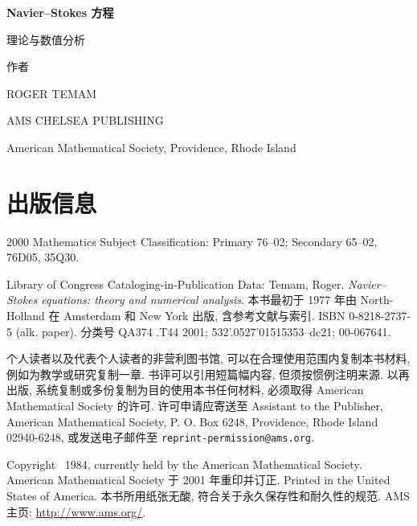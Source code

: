 \hypersetup{pageanchor=false}



\clearpage
\thispagestyle{empty}
\null
\clearpage

\begin{titlepage}
  \centering
  \vspace*{0.16\textheight}
  {\Huge\bfseries Navier--Stokes 方程\par}
  \vspace{0.8em}
  {\LARGE 理论与数值分析\par}
  \vspace{2.5em}
  {\large 作者\par}
  \vspace{0.5em}
  {\Large ROGER TEMAM\par}
  \vfill
  {AMS CHELSEA PUBLISHING\par}
  {American Mathematical Society, Providence, Rhode Island\par}
\end{titlepage}

\clearpage
\hypersetup{pageanchor=true}
\thispagestyle{empty}
\section*{出版信息}

2000 Mathematics Subject Classification: Primary 76--02; Secondary 65--02, 76D05, 35Q30.

Library of Congress Cataloging-in-Publication Data: Temam, Roger. \emph{Navier--Stokes equations: theory and numerical analysis}. 本书最初于 1977 年由 North-Holland 在 Amsterdam 和 New York 出版, 含参考文献与索引. ISBN 0-8218-2737-5 (alk. paper). 分类号 QA374 .T44 2001; 532'.0527'01515353--dc21; 00-067641.

个人读者以及代表个人读者的非营利图书馆, 可以在合理使用范围内复制本书材料, 例如为教学或研究复制一章. 书评可以引用短篇幅内容, 但须按惯例注明来源. 以再出版, 系统复制或多份复制为目的使用本书任何材料, 必须取得 American Mathematical Society 的许可. 许可申请应寄送至 Assistant to the Publisher, American Mathematical Society, P. O. Box 6248, Providence, Rhode Island 02940-6248, 或发送电子邮件至 \texttt{reprint-permission@ams.org}.

Copyright \textcopyright\ 1984, currently held by the American Mathematical Society. American Mathematical Society 于 2001 年重印并订正. Printed in the United States of America. 本书所用纸张无酸, 符合关于永久保存性和耐久性的规范. AMS 主页: \url{http://www.ams.org/}.

